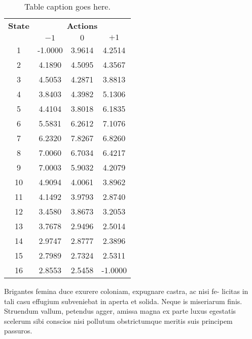 \begin{table}
    \centering
    \begin{tabular}{c c c c}
        \toprule
        \textbf{State} & \multicolumn{3}{c}{\textbf{Actions}} \\
        \cmidrule{2-4}
        & \textbf{$-1$} & \textbf{$0$} & \textbf{$+1$} \\
        \midrule
        1       & -1.0000   &   3.9614  &   4.2514  \\
        2       &  4.1890   &   4.5095  &   4.3567  \\
        3       &  4.5053   &   4.2871  &   3.8813  \\
        4       &  3.8403   &   4.3982  &   5.1306  \\
        5       &  4.4104   &   3.8018  &   6.1835  \\
        6       &  5.5831   &   6.2612  &   7.1076  \\
        7       &  6.2320   &   7.8267  &   6.8260  \\
        8       &  7.0060   &   6.7034  &   6.4217  \\
        9       &  7.0003   &   5.9032  &   4.2079  \\
        10      &  4.9094   &   4.0061  &   3.8962  \\
        11      &  4.1492   &   3.9793  &   2.8740  \\
        12      &  3.4580   &   3.8673  &   3.2053  \\
        13      &  3.7678   &   2.9496  &   2.5014  \\
        14      &  2.9747   &   2.8777  &   2.3896  \\
        15      &  2.7989   &   2.7324  &   2.5311  \\
        16      &  2.8553   &   2.5458  &  -1.0000  \\
        \bottomrule
    \end{tabular}
    \caption[Sample table description]{Table caption goes here.}
    \label{tab:foo}
\end{table}

Brigantes femina duce exurere coloniam, expugnare castra, ac nisi fe- licitas in tali casu effugium subveniebat in aperta et solida. Neque is miseriarum finis. Struendum vallum, petendus agger, amissa magna ex parte luxus egestatis scelerum sibi conscios nisi pollutum obstrictumque meritis suis principem passuros.

